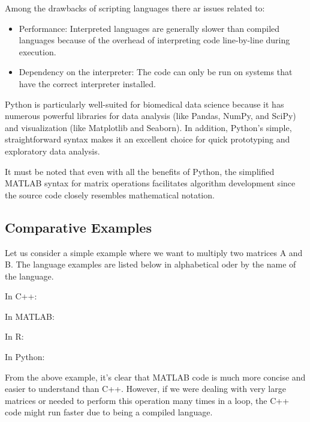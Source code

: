 Among the drawbacks of scripting languages there ar issues related to:

\begin{itemize}
	\item Performance: Interpreted languages are generally slower than compiled languages because of the overhead of interpreting code line-by-line during execution.
	\item Dependency on the interpreter: The code can only be run on systems that have the correct interpreter installed.
\end{itemize}

Python is particularly well-suited for biomedical data science because it has numerous powerful libraries for data analysis (like Pandas, NumPy, and SciPy) and visualization (like Matplotlib and Seaborn). In addition, Python's simple, straightforward syntax makes it an excellent choice for quick prototyping and exploratory data analysis. 

It must be noted that even with all the benefits of Python, the simplified MATLAB syntax for matrix operations facilitates  algorithm development since the source code closely resembles mathematical notation.   

\subsection{Comparative Examples}

Let us consider a simple example where we want to multiply two matrices A and B. The language examples are listed below in alphabetical oder by the name of the language.  

In C++:
 

In MATLAB:



In R: 


In Python:


From the above example, it's clear that MATLAB code is much more concise and easier to understand than C++. However, if we were dealing with very large matrices or needed to perform this operation many times in a loop, the C++ code might run faster due to being a compiled language.


